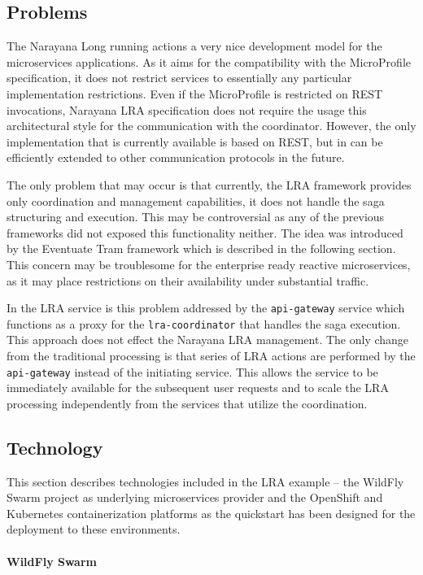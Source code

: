 \documentclass[oneside,
  digital, %
  table,   %
  nolof,     %
  nolot,     %
]{fithesis3}
\newcommand{\newlinepar}[1]{\paragraph{#1}\needspace{4\baselineskip}\mbox{}\\}
\begin{document}
\subsection{Problems}

The Narayana Long running actions a very nice development model for the microservices applications. As it aims for the compatibility with the MicroProfile specification, it does not restrict services to essentially any particular implementation restrictions. Even if the MicroProfile is restricted on REST invocations, Narayana LRA specification does not require the usage this architectural style for the communication with the coordinator. However, the only implementation that is currently available is based on REST, but in can be efficiently extended to other communication protocols in the future.

The only problem that may occur is that currently, the LRA framework provides only coordination and management capabilities, it does not handle the saga structuring and execution. This may be controversial as any of the previous frameworks did not exposed this functionality neither. The idea was introduced by the Eventuate Tram framework which is described in the following section. This concern may be troublesome for the enterprise ready reactive microservices, as it may place restrictions on their availability under substantial traffic. 

In the LRA service is this problem addressed by the \texttt{api-gateway} service which functions as a proxy for the \texttt{lra-coordinator} that handles the saga execution. This approach does not effect the Narayana LRA management. The only change from the traditional processing is that series of LRA actions are performed by the \texttt{api-gateway} instead of the initiating service. This allows the service to be immediately available for the subsequent user requests and to scale the LRA processing independently from the services that utilize the coordination.

\subsection{Technology}

This section describes technologies included in the LRA example -- the WildFly Swarm project as underlying microservices provider and the OpenShift and Kubernetes containerization platforms as the quickstart has been designed for the deployment to these environments.

\newlinepar{WildFly Swarm}
\end{document}
